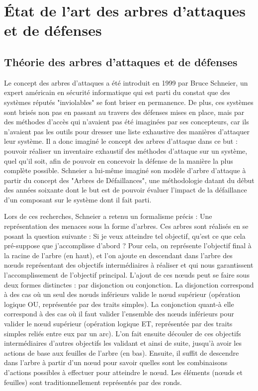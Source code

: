 \section{\'Etat de l'art des arbres d'attaques et de défenses}
    \subsection{Théorie des arbres d'attaques et de défenses}
        Le concept des arbres d'attaques a été introduit en 1999 par Bruce Schneier, un expert américain en sécurité informatique qui est parti du constat que des systèmes réputés "inviolables" se font briser en permanence. De plus, ces systèmes sont brisés non pas en passant au travers des défenses mises en place, mais par des méthodes d'accès qui n'avaient pas été imaginées par ses concepteurs, car ils n'avaient pas les outils pour dresser une liste exhaustive des manières d'attaquer leur système. Il a donc imaginé le concept des arbres d'attaque dans ce but : pouvoir réaliser un inventaire exhaustif des méthodes d'attaque sur un système, quel qu'il soit, afin de pouvoir en concevoir la défense de la manière la plus complète possible. Schneier a lui-même imaginé son modèle d'arbre d'attaque à partir du concept des "Arbres de Défaillances", une méthodologie datant du début des années soixante dont le but est de pouvoir évaluer l'impact de la défaillance d'un composant sur le système dont il fait parti. 

		Lors de ces recherches, Schneier a retenu un formalisme précis : Une représentation des menaces sous la forme d'arbres. Ces arbres sont réalisés en se posant la question suivante : Si je veux atteindre tel objectif, qu'est ce que cela pré-suppose que j'accomplisse d'abord ? Pour cela, on représente l'objectif final à la racine de l'arbre (en haut), et l'on ajoute en descendant dans l'arbre des nœuds représentant des objectifs intermédiaires à réaliser et qui nous garantissent l'accomplissement de l'objectif principal. L'ajout de ces nœuds peut se faire sous deux formes distinctes : par disjonction ou conjonction. La disjonction correspond à des cas où un seul des nœuds inférieurs valide le nœud supérieur (opération logique OU, représentée par des traits simples). La conjonction quant-à elle correspond à des cas où il faut valider l'ensemble des nœuds inférieurs pour valider le nœud supérieur (opération logique ET, représentée par des traits simples reliés entre eux par un arc). L'on fait ensuite découler de ces objectifs intermédiaires d'autres objectifs les validant et ainsi de suite, jusqu'à avoir les actions de base aux feuilles de l'arbre (en bas). Ensuite, il suffit de descendre dans l'arbre à partir d'un nœud pour savoir quelles sont les combinaisons d'actions possibles à effectuer pour atteindre le nœud. Les éléments (nœuds et feuilles) sont traditionnellement représentés par des ronds.

